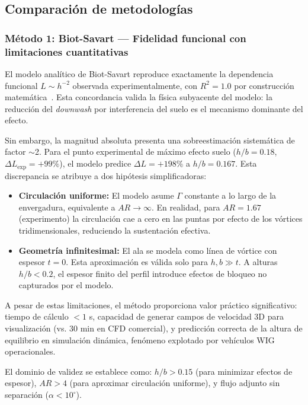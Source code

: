\documentclass[twocolumn]{article}
\begin{document}
\subsection{Comparación de metodologías}

\subsubsection{Método 1: Biot-Savart --- Fidelidad funcional con limitaciones cuantitativas}

El modelo analítico de Biot-Savart reproduce exactamente la dependencia funcional $L \sim h^{-2}$ observada experimentalmente, con $R^2 = 1.0$ por construcción matemática~\cite{wieselsberger1922}. Esta concordancia valida la física subyacente del modelo: la reducción del \textit{downwash} por interferencia del suelo es el mecanismo dominante del efecto.

Sin embargo, la magnitud absoluta presenta una sobreestimación sistemática de factor $\sim$2. Para el punto experimental de máximo efecto suelo ($h/b = 0.18$, $\Delta L_{\exp} = +99\%$), el modelo predice $\Delta L = +198\%$ a $h/b = 0.167$. Esta discrepancia se atribuye a dos hipótesis simplificadoras:

\begin{itemize}
\item \textbf{Circulación uniforme:} El modelo asume $\Gamma$ constante a lo largo de la envergadura, equivalente a $AR \to \infty$. En realidad, para $AR = 1.67$ (experimento) la circulación cae a cero en las puntas por efecto de los vórtices tridimensionales, reduciendo la sustentación efectiva.
 \item \textbf{Geometría infinitesimal:} El ala se modela como línea de vórtice con espesor $t = 0$. Esta aproximación es válida solo para $h, b \gg t$. A alturas $h/b < 0.2$, el espesor finito del perfil introduce efectos de bloqueo no capturados por el modelo.
\end{itemize}

A pesar de estas limitaciones, el método proporciona valor práctico significativo: tiempo de cálculo $< 1$ s, capacidad de generar campos de velocidad 3D para visualización (vs. 30 min en CFD comercial), y predicción correcta de la altura de equilibrio en simulación dinámica, fenómeno explotado por vehículos WIG operacionales.

El dominio de validez se establece como: $h/b > 0.15$ (para minimizar efectos de espesor), $AR > 4$ (para aproximar circulación uniforme), y flujo adjunto sin separación ($\alpha < 10^{\circ}$).
\end{document}

